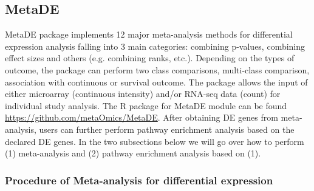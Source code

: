 \subsection{MetaDE}

MetaDE package implements 12 major meta-analysis methods for differential expression analysis falling into 3 main categories: combining p-values, combining effect sizes and others (e.g. combining ranks, etc.). Depending on the types of outcome, the package can perform two class comparisons, multi-class comparison, association with continuous or survival outcome. The package allows the input of either microarray (continuous intensity) and/or RNA-seq data (count) for individual study analysis. 
The R package for MetaDE module can be found \url{https://github.com/metaOmics/MetaDE}.
After obtaining DE genes from meta-analysis, 
users can further perform pathway enrichment analysis based on the declared DE genes.
In the two subsections below we will go over how to perform (1) meta-analysis and (2) pathway enrichment analysis based on (1).


\subsubsection{Procedure of Meta-analysis for differential expression}

